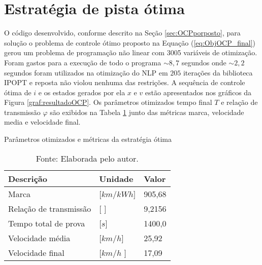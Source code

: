 %     

%     

\section{Estratégia de pista ótima}
\label{sec:resultados_otimo}
 
O código desenvolvido, conforme descrito na Seção \ref{sec:OCPporposto}, para solução o problema de controle ótimo proposto na Equação 
(\ref{eq:ObjOCP_final}) gerou um problema de programação não linear com 3005 variáveis de otimização.
Foram gastos para a execução de todo o programa $\sim 8,7$ segundos onde $\sim 2,2$ segundos foram utilizados na otimização do NLP em $205$ iterações da biblioteca IPOPT e reposta não violou nenhuma das restrições. 
A sequência de controle ótima de $i$ e os estados gerados por ela $x$ e $v$ estão apresentados nos gráficos da Figura \ref{graf:resultadoOCP}. 
Os parâmetros otimizados tempo final $T$ e relação de transmissão $\varphi$ são exibidos na Tabela \ref{tab:resultadoOCP} junto das métricas marca, velocidade media e velocidade final. 

\begin{table}[h]
	\centering
	\caption{Parâmetros otimizados e métricas da estratégia ótima}
	\begin{tabular}{lll}
		\toprule
		\textbf{Descrição} & \textbf{Unidade} & \textbf{Valor}\\
		\hline
		Marca                               & [$km/kWh$]   & 905,68  \\
        Relação de transmissão              & [ ]          & 9,2156   \\
        Tempo total de prova                & [$s$]        & 1400,0  \\  
        Velocidade média                    & [$km/h$]     & 25,92   \\
        Velocidade final                    & [$km/h$ ]    & 17,09   \\
		\bottomrule
	\end{tabular}
	\caption*{\footnotesize Fonte: Elaborada pelo autor.}
	\label{tab:resultadoOCP}
\end{table}

